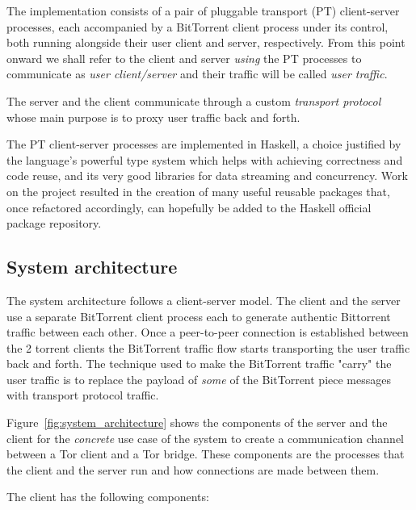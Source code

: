 \documentclass[11pt]{article} %
\begin{document}
The implementation consists of a pair of pluggable transport (PT) client-server processes, each accompanied by a BitTorrent client process under its control, both running alongside their user client and server, respectively. From this point onward we shall refer to the client and server \textit{using} the PT processes to communicate as \textit{user client/server} and their traffic will be called \textit{user traffic}. 

The server and the client communicate through a custom \textit{transport protocol} whose main purpose is to proxy user traffic back and forth. 

The PT client-server processes are implemented in Haskell, a choice justified by the language's powerful type system which helps with achieving correctness and code reuse, and its very good libraries for data streaming and concurrency. Work on the project resulted in the creation of many useful reusable packages that, once refactored accordingly, can hopefully be added to the Haskell official package repository.

\subsection{System architecture}

The system architecture follows a client-server model. The client and the server use a separate BitTorrent client process each to generate authentic Bittorrent traffic between each other. Once a peer-to-peer connection is established between the 2 torrent clients the BitTorrent traffic flow starts transporting the user traffic back and forth. The technique used to make the BitTorrent traffic "carry" the user traffic is to replace the payload of \textit{some} of the BitTorrent piece messages with transport protocol traffic. 


Figure~\ref{fig:system_architecture} shows the components of the server and the client for the \textit{concrete} use case of the system to create a communication channel between a Tor client and a Tor bridge. These components are the processes that the client and the server run and how connections are made between them.

The client has the following components:
\end{document}
